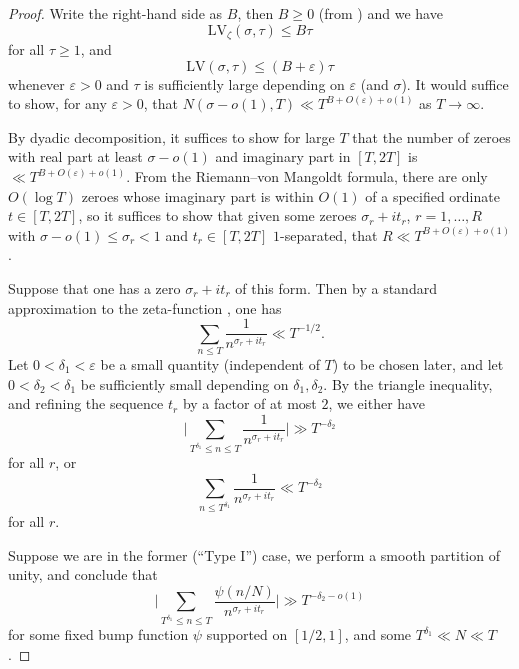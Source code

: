 \documentclass[a4paper, 10pt]{amsart}
\newcommand{\eps}{\varepsilon}
\newcommand{\LV}{\mathrm{LV}}
\begin{document}
\begin{proof}
    Write the right-hand side as $B$, then $B \geq 0$ (from ) and we have
    \begin{equation}\label{lvz-bound}
        \LV_\zeta(\sigma,\tau) \leq B \tau
    \end{equation}
    for all $\tau \geq 1$, and
    \begin{equation}\label{lv-bound}
        \LV(\sigma,\tau) \leq (B+\eps) \tau
    \end{equation}
    whenever $\eps>0$ and $\tau$ is sufficiently large depending on $\eps$ (and $\sigma$).  It would suffice to show, for any $\eps>0$, that $N(\sigma-o(1),T) \ll T^{B+O(\eps)+o(1)}$ as $T \to \infty$.

    By dyadic decomposition, it suffices to show for large $T$ that the number of zeroes with real part at least $\sigma-o(1)$ and imaginary part in  $[T,2T]$ is $\ll T^{B+O(\eps)+o(1)}$.  From the Riemann--von Mangoldt formula, there are only $O(\log T)$ zeroes whose imaginary part is within $O(1)$ of a specified ordinate $t \in [T,2T]$, so it suffices to show that given some zeroes $\sigma_r + i t_r$, $r=1,\dots,R$ with $\sigma-o(1) \leq \sigma_r < 1$ and $t_r \in [T,2T]$ $1$-separated, that $R \ll T^{B+O(\eps)+o(1)}$.

    Suppose that one has a zero $\sigma_r+i t_r$ of this form.  Then by a standard approximation to the zeta-function \cite[Theorem 1.8]{ivic}, one has
    $$ \sum_{n \leq T} \frac{1}{n^{\sigma_r+it_r}} \ll T^{-1/2}.$$
    Let $0 < \delta_1 < \eps$ be a small quantity (independent of $T$) to be chosen later, and let $0 < \delta_2 < \delta_1$ be sufficiently small depending on $\delta_1,\delta_2$.  By the triangle inequality, and refining the sequence $t_r$ by a factor of at most $2$, we either have
    $$ \bigg|\sum_{T^{\delta_1} \leq n \leq T} \frac{1}{n^{\sigma_r+it_r}} \bigg| \gg T^{-\delta_2}$$
    for all $r$, or
    \begin{equation}\label{td}
     \sum_{n \leq T^{\delta_1}} \frac{1}{n^{\sigma_r+it_r}} \ll T^{-\delta_2}
    \end{equation}
    for all $r$.

    Suppose we are in the former (``Type I'') case, we perform a smooth partition of unity, and conclude that
    $$ \bigg|\sum_{T^{\delta_1} \leq n \leq T} \frac{\psi(n/N)}{n^{\sigma_r+it_r}} \bigg| \gg T^{-\delta_2 - o(1)}$$
    for some fixed bump function $\psi$ supported on $[1/2,1]$, and some $T^{\delta_1} \ll N \ll T$.


\end{proof}
\end{document}
